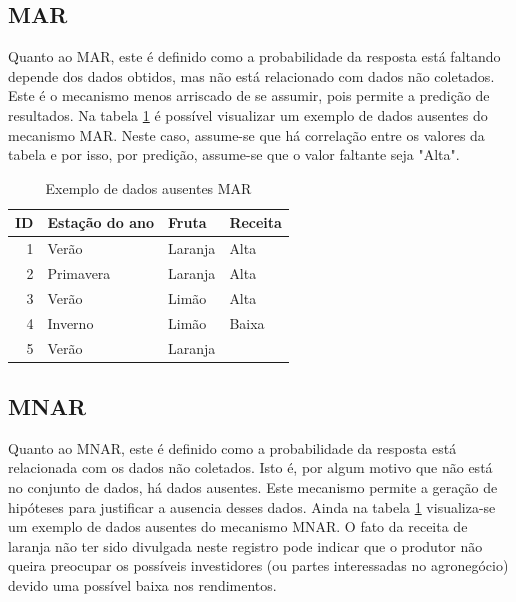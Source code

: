 \documentclass[
	12pt,				%
	openright,			%
	twoside,			%
	a4paper,			%
	english,			%
	brazil				%
	]{abntex2}
\begin{document}
		\subsection{MAR}
			Quanto ao MAR, este é definido como a probabilidade da resposta está faltando depende dos dados obtidos, mas não está relacionado com dados não coletados.
			Este é o mecanismo menos arriscado de se assumir, pois permite a predição de resultados. \cite{hbmissingdatameth2014} \cite{little2016missing}
			Na tabela \ref{table: exemplo DA MAR e DA MNAR} é possível visualizar um exemplo de dados ausentes do mecanismo MAR.
			Neste caso, assume-se que há correlação entre os valores da tabela e por isso, por predição, assume-se que o valor faltante seja "Alta".
			\begin{table}[h]
				\centering
				\caption{Exemplo de dados ausentes MAR}
				\vspace{0.5cm}
				\label{table: exemplo DA MAR e DA MNAR}
				\begin{tabular}{r|lll}
				
					ID & Estação do ano & Fruta & Receita \\ %
					\hline                               %
					1 & Verão     & Laranja & Alta  \\
					2 & Primavera & Laranja & Alta  \\
					3 & Verão     & Limão   & Alta  \\
					4 & Inverno   & Limão   & Baixa \\
					5 & Verão     & Laranja &         %
				
				\end{tabular}
			\end{table}
		
		\subsection{MNAR}
			Quanto ao MNAR, este é definido como a probabilidade da resposta está relacionada com os dados não coletados. \cite{hbmissingdatameth2014} \cite{little2016missing}
			Isto é, por algum motivo que não está no conjunto de dados, há dados ausentes.
			Este mecanismo permite a geração de hipóteses para justificar a ausencia desses dados. %
			Ainda na tabela \ref{table: exemplo DA MAR e DA MNAR} visualiza-se um exemplo de dados ausentes do mecanismo MNAR.
			O fato da receita de laranja não ter sido divulgada neste registro pode indicar que o produtor não queira preocupar os possíveis investidores (ou partes interessadas no agronegócio) devido uma possível baixa nos rendimentos.
			
\end{document}
